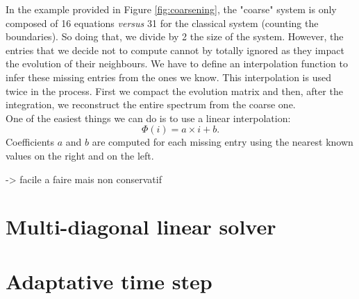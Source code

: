 \documentclass[11pt,a4paper]{article}
\begin{document}
In the example provided in Figure \ref{fig:coarsening}, the "coarse" system is only composed of 16 equations \textit{versus} 31 for the classical system (counting the boundaries). So doing that, we divide by 2 the size of the system. However, the entries that we decide not to compute cannot by totally ignored as they impact the evolution of their neighbours. We have to define an interpolation function to infer these missing entries from the ones we know.
This interpolation is used twice in the process. First we compact the evolution matrix and then, after the integration, we reconstruct the entire spectrum from the coarse one. \\

One of the easiest things we can do is to use a linear interpolation: $$\Phi(i) = a\times i +b.$$
Coefficients $a$ and $b$ are computed for each missing entry using the nearest known values on the right and on the left.


-> facile a faire mais non conservatif

\section{Multi-diagonal linear solver}

\section{Adaptative time step}
\end{document}
